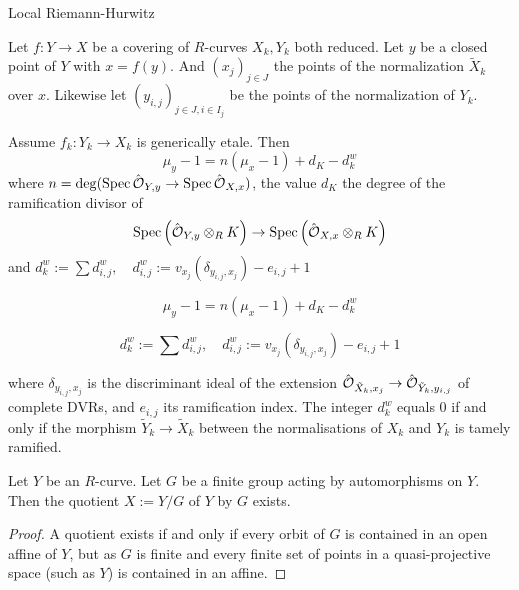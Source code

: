 \begin{frame}{Local Riemann-Hurwitz}
    \begin{proposition}[Kato]
        Let $f\colon Y \to X$  be a covering of $R$-curves $X_k,Y_k$ both reduced. Let $y$ be a closed point of $Y$ with $x = f(y)$. And $(x_j)_{j\in J}$ the points of the normalization $\widetilde X_k$ over $x$.
        Likewise let $(y_{i,j})_{j\in J, i \in I_j}$ be the points of the normalization of $Y_k$.

        Assume $f_k \colon Y_k \to X_k$ is generically etale. Then
        $$ \mu _y - 1  = n ( \mu _x - 1) + d_K - d_k^w$$
        where $n = \deg (\operatorname{Spec} \hat{\operatorname{\mathcal{O}}}_{Y, y} \rightarrow \operatorname{Spec} \hat{\operatorname{\mathcal{O}}}_{X, x})$, the value $d_K$ the degree of the ramification divisor of
        $$ \operatorname{Spec}\left(\hat{\operatorname{\mathcal{O}}}_{Y, y} \otimes_{R} K\right) \rightarrow \operatorname{Spec}\left(\hat{\operatorname{\mathcal{O}}}_{X, x} \otimes_{R} K\right)$$
        and $\displaystyle d_{k}^{w}:=\sum d_{i, j}^{w}, \quad d_{i, j}^{w}:=v_{x_{j}}\left(\delta_{y_{i, j}, x_{j}}\right)-e_{i, j}+1$
    \end{proposition}
\end{frame}
\begin{frame}

    $$ \mu _y - 1  = n ( \mu _x - 1) + d_K - d_k^w$$

    $$\displaystyle d_{k}^{w}:=\sum d_{i, j}^{w}, \quad d_{i, j}^{w}:=v_{x_{j}}\left(\delta_{y_{i, j}, x_{j}}\right)-e_{i, j}+1$$

    where $\delta_{y_{i, j}, x_{j}}$ is the discriminant ideal of the extension $\hat{\operatorname{\mathcal{O}}}_{\tilde{X}_{k}, x_{j}} \rightarrow \hat{\operatorname{\mathcal{O}}}_{\tilde{Y}_{k}, y_{i, j}}$ of complete DVRs, and $e_{i, j}$ its ramification index. The integer $d_{k}^{w}$ equals 0 if and only if the morphism $\tilde{Y}_{k} \rightarrow \tilde{X}_{k}$ between the normalisations of $X_{k}$ and $Y_{k}$ is tamely ramified.
\end{frame}

\begin{frame}
    \begin{proposition}
        Let $Y$ be an $R$-curve. Let $G$ be a finite group acting by automorphisms on $Y$. Then the quotient $X:=Y / G$ of $Y$ by $G$ exists.
    \end{proposition}
    \begin{proof}
        A quotient exists if and only if every orbit of $G$ is contained in an open affine of $Y$, but as $G$ is finite and every finite set of points in a quasi-projective space (such as $Y$) is contained in an affine.
    \end{proof}
\end{frame}

